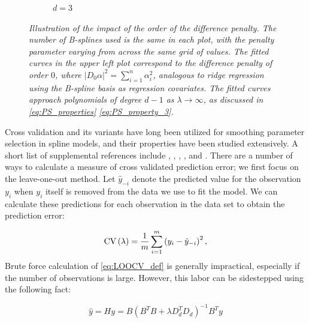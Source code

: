 \documentclass[12pt]{article}
\theoremstyle{definition}
\begin{document}
\begin{figure}[H]
\begin{subfigure}{.5\textwidth}
\caption{$d=3$}
\end{subfigure}
\caption{\textit{Illustration of the impact of the order of the difference penalty. The number of B-splines used is the same in each plot, with the penalty parameter varying from across the same grid of values. The fitted curves in the upper left plot correspond to the difference penalty of order $0$, where $\vert D_0 \alpha \vert^2 = \sum_{i=1}^n \alpha_i^2$, analogous to ridge regression using the B-spline basis as regression covariates. The fitted curves approach polynomials of degree $d-1$ as $\lambda \rightarrow \infty$, as discussed in \ref{eq:PS_properties} \ref{eq:PS_property_3}.}}
\label{fig:PS_penalty_section_figure_6}
\end{figure}



Cross validation and its variants have long been utilized for smoothing parameter selection in spline models, and their properties have been studied extensively. A short list of supplemental references include \cite{craven1978smoothing}, \cite{wahba1985comparison}, \cite{hardle1988far}, \cite{hardle1992applied}, and \cite{wahba1990spline}. There are a number of ways to calculate a measure of cross validated prediction error; we first focus on the leave-one-out method. Let $\hat{y}_{-i}$ denote the predicted value for the observation $y_i$ when $y_i$ itself is removed from the data we use to fit the model. We can calculate these predictions for each observation in the data set to obtain the prediction error:

\begin{equation} \label{eq:LOOCV_def}
\textup{CV}\left(\lambda\right) = \frac{1}{m}\sum_{i=1}^m \left(  y_i - \hat{y}_{-i}\right)^2, 
\end{equation}
Brute force calculation of \ref{eq:LOOCV_def} is generally impractical, especially if the number of observations is large. However, this labor can be sidestepped using the following fact: 

\begin{equation*}
\hat{y} = Hy = B\left(B^TB + \lambda D_d^T D_d \right)^{-1} B^T y
\end{equation*}
\end{document}
